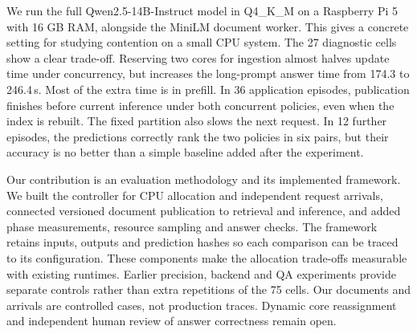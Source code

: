 We run the full Qwen2.5-14B-Instruct model in Q4\_K\_M on a Raspberry Pi 5
with 16 GB RAM, alongside the MiniLM document worker. This gives a concrete
setting for studying contention on a small CPU system. The 27 diagnostic
cells show a clear trade-off. Reserving two
cores for ingestion almost halves update time under concurrency, but increases
the long-prompt answer time from 174.3 to 246.4\,s. Most of the extra time is in
prefill. In 36 application episodes, publication finishes before current
inference under both concurrent policies, even when the index is rebuilt.
The fixed partition also slows the next request. In 12 further episodes, the
predictions correctly rank the two policies in six pairs, but their accuracy
is no better than a simple baseline added after the experiment.

Our contribution is an evaluation methodology and its implemented framework.
We built the controller for CPU allocation and independent request arrivals,
connected versioned document publication to retrieval and inference, and added
phase measurements, resource sampling and answer checks. The framework retains
inputs, outputs and prediction hashes so each comparison can be traced to its
configuration. These components make the allocation trade-offs measurable with
existing runtimes. Earlier precision, backend and QA experiments provide
separate controls rather than extra repetitions of the 75 cells. Our documents
and arrivals are controlled cases, not production traces. Dynamic core
reassignment and independent human review of answer correctness remain open.
